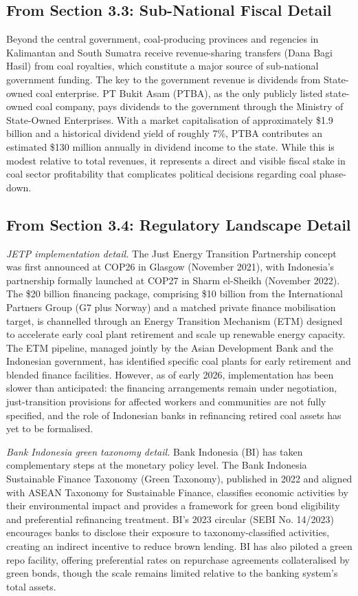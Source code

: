 \subsection*{From Section 3.3: Sub-National Fiscal Detail}

Beyond the central government, coal-producing provinces and regencies in Kalimantan and South Sumatra receive revenue-sharing transfers (Dana Bagi Hasil) from coal royalties, which constitute a major source of sub-national government funding. The key to the government revenue is dividends from State-owned coal enterprise. PT Bukit Asam (PTBA), as the only publicly listed state-owned coal company, pays dividends to the government through the Ministry of State-Owned Enterprises. With a market capitalisation of approximately \$1.9 billion and a historical dividend yield of roughly 7\%, PTBA contributes an estimated \$130 million annually in dividend income to the state. While this is modest relative to total revenues, it represents a direct and visible fiscal stake in coal sector profitability that complicates political decisions regarding coal phase-down.

\subsection*{From Section 3.4: Regulatory Landscape Detail}

\textit{JETP implementation detail.} The Just Energy Transition Partnership concept was first announced at COP26 in Glasgow (November 2021), with Indonesia's partnership formally launched at COP27 in Sharm el-Sheikh (November 2022). The \$20 billion financing package, comprising \$10 billion from the International Partners Group (G7 plus Norway) and a matched private finance mobilisation target, is channelled through an Energy Transition Mechanism (ETM) designed to accelerate early coal plant retirement and scale up renewable energy capacity. The ETM pipeline, managed jointly by the Asian Development Bank and the Indonesian government, has identified specific coal plants for early retirement and blended finance facilities. However, as of early 2026, implementation has been slower than anticipated: the financing arrangements remain under negotiation, just-transition provisions for affected workers and communities are not fully specified, and the role of Indonesian banks in refinancing retired coal assets has yet to be formalised.

\textit{Bank Indonesia green taxonomy detail.} Bank Indonesia (BI) has taken complementary steps at the monetary policy level. The Bank Indonesia Sustainable Finance Taxonomy (Green Taxonomy), published in 2022 and aligned with ASEAN Taxonomy for Sustainable Finance, classifies economic activities by their environmental impact and provides a framework for green bond eligibility and preferential refinancing treatment. BI's 2023 circular (SEBI No. 14/2023) encourages banks to disclose their exposure to taxonomy-classified activities, creating an indirect incentive to reduce brown lending. BI has also piloted a green repo facility, offering preferential rates on repurchase agreements collateralised by green bonds, though the scale remains limited relative to the banking system's total assets.

